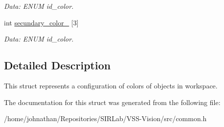 \begin{DoxyCompactItemize}
\begin{DoxyCompactList}\small\item\em Data\+: E\+N\+UM id\+\_\+color. \end{DoxyCompactList}\item 
int \hyperlink{structcommon_1_1ExecConfiguration_aea1aed941fceb299c6766e6330ec802e}{secundary\+\_\+color\+\_} \mbox{[}3\mbox{]}\hypertarget{structcommon_1_1ExecConfiguration_aea1aed941fceb299c6766e6330ec802e}{}\label{structcommon_1_1ExecConfiguration_aea1aed941fceb299c6766e6330ec802e}

\begin{DoxyCompactList}\small\item\em Data\+: E\+N\+UM id\+\_\+color. \end{DoxyCompactList}\end{DoxyCompactItemize}


\subsection{Detailed Description}
This struct represents a configuration of colors of objects in workspace. 

The documentation for this struct was generated from the following file\+:\begin{DoxyCompactItemize}
\item 
/home/johnathan/\+Repositories/\+S\+I\+R\+Lab/\+V\+S\+S-\/\+Vision/src/common.\+h\end{DoxyCompactItemize}
